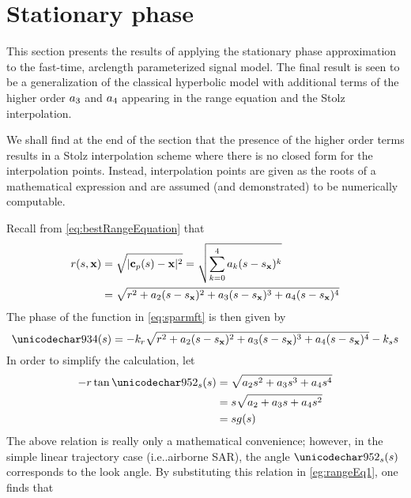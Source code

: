 \section{Stationary phase}
This section presents the results of applying the stationary phase approximation to the fast-time, arclength parameterized signal model. The final result is seen to be a generalization of the classical hyperbolic model with additional terms of the higher order $a_3$ and $a_4$  appearing in the range equation and the Stolz interpolation. 
\par
We shall find at the end of the section that the presence of the higher order terms results in a Stolz interpolation scheme where there is no closed form for the interpolation points. Instead, interpolation points are given as the roots of a mathematical expression and are assumed (and demonstrated) to be numerically computable.
\par
Recall from \eqref{eq:bestRangeEquation} that
\begin{equation}
\begin{split}
r(s, \mathbf{\mathbf{x}}) &= \sqrt{\lvert\mathbf{c}_p(s)-\mathbf{\mathbf{x}}\rvert^2} = \sqrt{\sum_{k=0}^4a_k(s-s_{\mathbf{x}})^k}\\
&=\sqrt{r^2 + a_2(s-s_{\mathbf{x}})^2 + a_3(s-s_{\mathbf{x}})^3 + a_4(s-s_{\mathbf{x}})^4}
\end{split}
\end{equation}
The phase of the function in \eqref{eq:sparmft} is then given by
\begin{equation}
 \Phi(\parm) = -\kr\sqrt{\targetrange^2 + \rcoeff_2(\parm-\targetxparm)^2 + \rcoeff_3(\parm-\targetxparm)^3 + \rcoeff_4(\parm-\targetxparm)^4} - \kparm\parm
 \label{eg:rangeEq1}
\end{equation}
In order to simplify the calculation, let
\begin{equation}
\begin{split}
 -\targetrange\tan\thetas(\parm) &= \sqrt{\rcoeff_2\parm^2 + \rcoeff_3\parm^3 + \rcoeff_4\parm^4}\\
 &=\parm\sqrt{\rcoeff_2 + \rcoeff_3\parm + \rcoeff_4\parm^2}\\
 &=\parm\gfunc(\parm)
\end{split}
\label{eq:gfunc}
\end{equation}
The above relation is really only a mathematical convenience; however, in the simple linear trajectory case (i.e..airborne SAR), the angle $\thetas(\parm)$ corresponds to the look angle. By substituting this relation in \eqref{eg:rangeEq1}, one finds that

